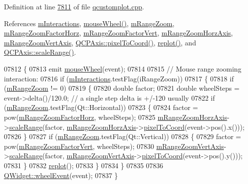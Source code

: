 Definition at line \hyperlink{a00115_source_l07811}{7811} of file \hyperlink{a00115_source}{qcustomplot.\+cpp}.



References \hyperlink{a00116_source_l02127}{m\+Interactions}, \hyperlink{a00067_source_l02492}{mouse\+Wheel()}, \hyperlink{a00116_source_l02119}{m\+Range\+Zoom}, \hyperlink{a00116_source_l02121}{m\+Range\+Zoom\+Factor\+Horz}, \hyperlink{a00116_source_l02121}{m\+Range\+Zoom\+Factor\+Vert}, \hyperlink{a00116_source_l02120}{m\+Range\+Zoom\+Horz\+Axis}, \hyperlink{a00116_source_l02120}{m\+Range\+Zoom\+Vert\+Axis}, \hyperlink{a00115_source_l04493}{Q\+C\+P\+Axis\+::pixel\+To\+Coord()}, \hyperlink{a00115_source_l07221}{replot()}, and \hyperlink{a00115_source_l04439}{Q\+C\+P\+Axis\+::scale\+Range()}.


\begin{DoxyCode}
07812 \{
07813   emit \hyperlink{a00116_ac80a14206f99304a91d2aa55775ec3ff}{mouseWheel}(event);
07814   
07815   \textcolor{comment}{// Mouse range zooming interaction:}
07816   \textcolor{keywordflow}{if} (\hyperlink{a00116_af8d040767753acc548b2368dd4150ae6}{mInteractions}.testFlag(iRangeZoom))
07817   \{
07818     \textcolor{keywordflow}{if} (\hyperlink{a00116_ac12a0fb503fccb899d786ceaa0a1a4f7}{mRangeZoom} != 0)
07819     \{
07820       \textcolor{keywordtype}{double} factor;
07821       \textcolor{keywordtype}{double} wheelSteps = \textcolor{keyword}{event}->delta()/120.0; \textcolor{comment}{// a single step delta is +/-120 usually}
07822       \textcolor{keywordflow}{if} (\hyperlink{a00116_ac12a0fb503fccb899d786ceaa0a1a4f7}{mRangeZoom}.testFlag(Qt::Horizontal))
07823       \{
07824         factor = pow(\hyperlink{a00116_a575195f0c4e9f7a766495da2ac41e0a6}{mRangeZoomFactorHorz}, wheelSteps);
07825         \hyperlink{a00116_a3239b66fb24563a5dda0503a69a892d5}{mRangeZoomHorzAxis}->\hyperlink{a00025_a7072ff96fe690148f1bbcdb4f773ea1c}{scaleRange}(factor, 
      \hyperlink{a00116_a3239b66fb24563a5dda0503a69a892d5}{mRangeZoomHorzAxis}->\hyperlink{a00025_ae9289ef7043b9d966af88eaa95b037d1}{pixelToCoord}(event->pos().x()));
07826       \}
07827       \textcolor{keywordflow}{if} (\hyperlink{a00116_ac12a0fb503fccb899d786ceaa0a1a4f7}{mRangeZoom}.testFlag(Qt::Vertical))
07828       \{
07829         factor = pow(\hyperlink{a00116_a133700b56f6b8e472f99058b43f5a0e9}{mRangeZoomFactorVert}, wheelSteps);
07830         \hyperlink{a00116_a16094e9a3c30151c3c820cd9d4894b84}{mRangeZoomVertAxis}->\hyperlink{a00025_a7072ff96fe690148f1bbcdb4f773ea1c}{scaleRange}(factor, 
      \hyperlink{a00116_a16094e9a3c30151c3c820cd9d4894b84}{mRangeZoomVertAxis}->\hyperlink{a00025_ae9289ef7043b9d966af88eaa95b037d1}{pixelToCoord}(event->pos().y()));
07831       \}
07832       \hyperlink{a00116_a563540b54b2a09c8ef092d42e9621f42}{replot}();
07833     \}
07834   \}
07835   
07836   \hyperlink{a00116_a7b8bd7e8d3a1d23a8595e9c6a6b76ef1}{QWidget::wheelEvent}(event);
07837 \}
\end{DoxyCode}


